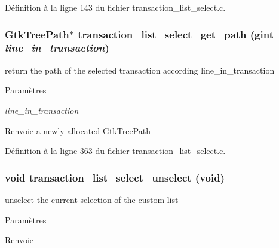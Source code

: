 Définition à la ligne 143 du fichier transaction\_\-list\_\-select.c.

\subsubsection[{transaction\_\-list\_\-select\_\-get\_\-path}]{\setlength{\rightskip}{0pt plus 5cm}GtkTreePath$\ast$ transaction\_\-list\_\-select\_\-get\_\-path (gint {\em line\_\-in\_\-transaction})}\label{transaction__list__select_8h_ac4dba240fa9e06af594157c07e62c2d8}
return the path of the selected transaction according line\_\-in\_\-transaction


\begin{DoxyParams}{Paramètres}
\item[{\em line\_\-in\_\-transaction}]\end{DoxyParams}
\begin{DoxyReturn}{Renvoie}
a newly allocated GtkTreePath 
\end{DoxyReturn}


Définition à la ligne 363 du fichier transaction\_\-list\_\-select.c.

\subsubsection[{transaction\_\-list\_\-select\_\-unselect}]{\setlength{\rightskip}{0pt plus 5cm}void transaction\_\-list\_\-select\_\-unselect (void)}\label{transaction__list__select_8h_afb819edf423709c65e5a7f0d427ddcf1}
unselect the current selection of the custom list


\begin{DoxyParams}{Paramètres}
\item[{\em }]\end{DoxyParams}
\begin{DoxyReturn}{Renvoie}

\end{DoxyReturn}



